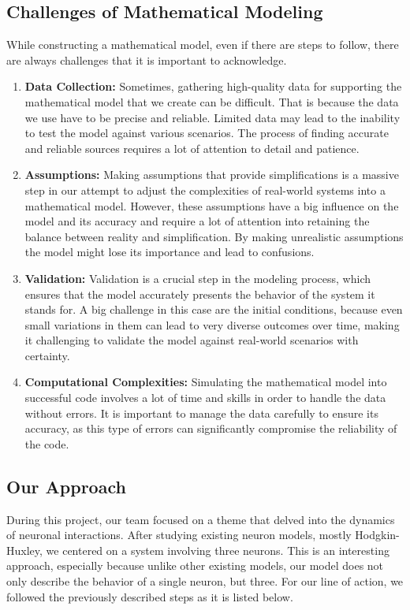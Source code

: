 \documentclass[class={myRUCProject}, crop=false]{standalone}
\begin{document}
\subsection{Challenges of Mathematical Modeling}
While constructing a mathematical model, even if there are steps to follow, there are always challenges that it is important to acknowledge. 

\begin{enumerate}
    \item \textbf{Data Collection:} Sometimes, gathering high-quality data for supporting the mathematical model that we create can be difficult. That is because the data we use have to be precise and reliable. Limited data may lead to the inability to test the model against various scenarios. The process of finding accurate and reliable sources requires a lot of attention to detail and patience.
    \item \textbf{Assumptions:}  Making assumptions that provide simplifications is a massive step in our attempt to adjust the complexities of real-world systems into a mathematical model. However, these assumptions have a big influence on the model and its accuracy and require a lot of attention into retaining the balance between reality and simplification. By making unrealistic assumptions the model might lose its importance and lead to confusions.
    \item \textbf{Validation:} Validation is a crucial step in the modeling process, which ensures that the model accurately presents the behavior of the system it stands for. A big challenge in this case are the initial conditions, because even small variations in them can lead to very diverse outcomes over time, making it challenging to validate the model against real-world scenarios with certainty. 
    \item \textbf{Computational Complexities:} Simulating the mathematical model into successful code involves a lot of time and skills in order to handle the data without errors. It is important to manage the data carefully to ensure its accuracy, as this type of errors can significantly compromise the reliability of the code.
\end{enumerate}

\subsection{Our Approach}
During this project, our team focused on a theme that delved into the dynamics of neuronal interactions. After studying existing neuron models, mostly Hodgkin-Huxley, we centered on a system involving three neurons. This is an interesting approach, especially because unlike other existing models, our model does not only describe the behavior of a single neuron, but three. For our line of action, we followed the previously described steps as it is listed below.
\end{document}
